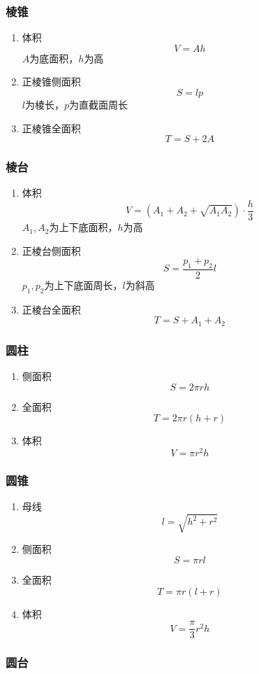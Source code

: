 \documentclass[a4paper]{article}
\begin{document}
\subsubsection{棱锥}

\begin{enumerate}
	\item 体积
	$$V=Ah$$
	$A$为底面积，$h$为高
	\item 正棱锥侧面积
	$$S=lp$$
	$l$为棱长，$p$为直截面周长
	\item 正棱锥全面积
	$$T=S+2A$$
\end{enumerate}

\subsubsection{棱台}

\begin{enumerate}
	\item 体积
	$$V=(A_1+A_2+\sqrt{A_1A_2}) \cdot \frac{h}{3}$$
	$A_1,A_2$为上下底面积，$h$为高
	\item 正棱台侧面积
	$$S=\frac{p_1+p_2}{2}l$$
	$p_1,p_2$为上下底面周长，$l$为斜高
	\item 正棱台全面积
	$$T=S+A_1+A_2$$
\end{enumerate}

\subsubsection{圆柱}

\begin{enumerate}
	\item 侧面积
	$$S=2\pi rh$$
	\item 全面积
	$$T=2\pi r(h+r)$$
	\item 体积
	$$V=\pi r^2h$$
\end{enumerate}

\subsubsection{圆锥}

\begin{enumerate}
	\item 母线
	$$l=\sqrt{h^2+r^2}$$
	\item 侧面积
	$$S=\pi rl$$
	\item 全面积
	$$T=\pi r(l+r)$$
	\item 体积
	$$V=\frac{\pi}{3} r^2h$$
\end{enumerate}

\subsubsection{圆台}
\end{document}
